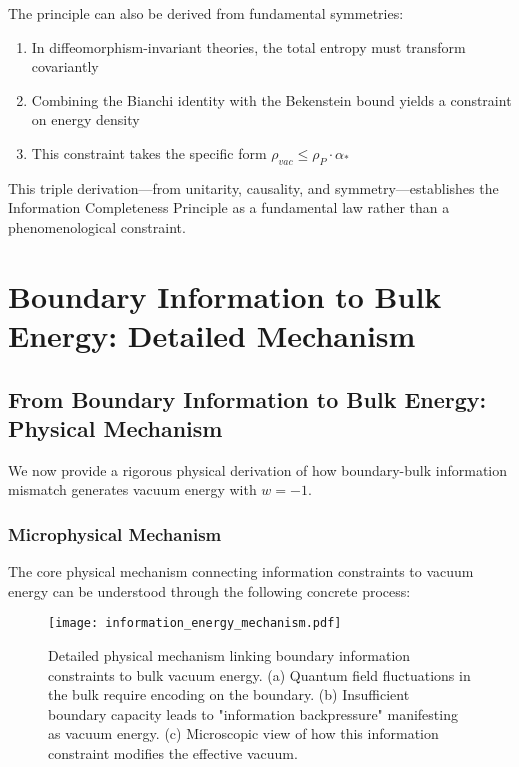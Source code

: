 \documentclass[12pt]{article}
\theoremstyle{plain}
\theoremstyle{definition}
\theoremstyle{remark}
\begin{document}
The principle can also be derived from fundamental symmetries:

\begin{enumerate}
\item In diffeomorphism-invariant theories, the total entropy must transform covariantly
\item Combining the Bianchi identity with the Bekenstein bound yields a constraint on energy density
\item This constraint takes the specific form $\rho_{vac} \leq \rho_P \cdot \alpha_*$
\end{enumerate}

This triple derivation—from unitarity, causality, and symmetry—establishes the Information Completeness Principle as a fundamental law rather than a phenomenological constraint.

\section{Boundary Information to Bulk Energy: Detailed Mechanism}

\subsection{From Boundary Information to Bulk Energy: Physical Mechanism}

We now provide a rigorous physical derivation of how boundary-bulk information mismatch generates vacuum energy with $w = -1$.

\subsubsection{Microphysical Mechanism}

The core physical mechanism connecting information constraints to vacuum energy can be understood through the following concrete process:

\begin{figure}
\centering
\texttt{[image: information\_energy\_mechanism.pdf]}
\caption{Detailed physical mechanism linking boundary information constraints to bulk vacuum energy. (a) Quantum field fluctuations in the bulk require encoding on the boundary. (b) Insufficient boundary capacity leads to "information backpressure" manifesting as vacuum energy. (c) Microscopic view of how this information constraint modifies the effective vacuum.}
\end{figure}
\end{document}

